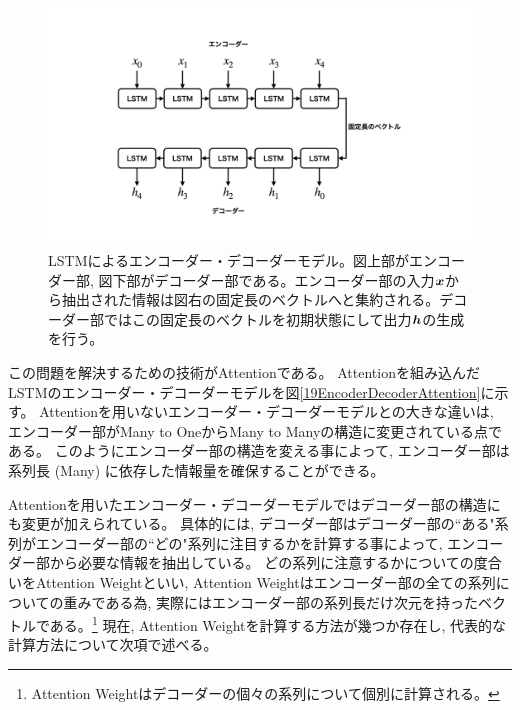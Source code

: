 \begin{figure}[htbp]
 \centering
 \includegraphics[trim = 100 100 100 200, width=1.0\textwidth, clip]{Figure/2DeepLearning/18EncoderDecoderLSTM.png}
 \caption[LSTMによるエンコーダー・デコーダーモデル]{LSTMによるエンコーダー・デコーダーモデル。図上部がエンコーダー部, 図下部がデコーダー部である。エンコーダー部の入力${\mbox{\boldmath{$x$}}}$から抽出された情報は図右の固定長のベクトルへと集約される。デコーダー部ではこの固定長のベクトルを初期状態にして出力${\mbox{\boldmath{$h$}}}$の生成を行う。}
 \label{18EncoderDecoderLSTM}
\end{figure}

この問題を解決するための技術がAttentionである。
Attentionを組み込んだLSTMのエンコーダー・デコーダーモデルを図\ref{19EncoderDecoderAttention}に示す。
Attentionを用いないエンコーダー・デコーダーモデルとの大きな違いは, エンコーダー部がMany to OneからMany to Manyの構造に変更されている点である。
このようにエンコーダー部の構造を変える事によって, エンコーダー部は系列長 (Many) に依存した情報量を確保することができる。

Attentionを用いたエンコーダー・デコーダーモデルではデコーダー部の構造にも変更が加えられている。
具体的には, デコーダー部はデコーダー部の``ある"系列がエンコーダー部の``どの"系列に注目するかを計算する事によって, エンコーダー部から必要な情報を抽出している。
どの系列に注意するかについての度合いをAttention Weightといい, Attention Weightはエンコーダー部の全ての系列についての重みである為, 実際にはエンコーダー部の系列長だけ次元を持ったベクトルである。\footnote{Attention Weightはデコーダーの個々の系列について個別に計算される。}
現在, Attention Weightを計算する方法が幾つか存在し, 代表的な計算方法について次項で述べる。

